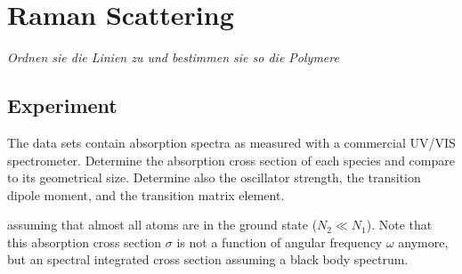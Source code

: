 

\chapter{Raman Scattering}

\textit{Ordnen sie die Linien zu und bestimmen sie so die Polymere
}
\section{Experiment}

The data sets contain absorption spectra as measured with a commercial UV/VIS spectrometer. Determine the absorption cross section of each species and compare to its geometrical size. Determine also the oscillator strength, the transition dipole moment, and the transition matrix element.

assuming that almost all atoms are in the ground state ($N_2 \ll N_1$). Note that this absorption cross section $\sigma$ is not a function of angular frequency $\omega$ anymore, but an spectral integrated cross section assuming a black body spectrum.





\printbibliography[segment=\therefsegment,heading=subbibliography]
